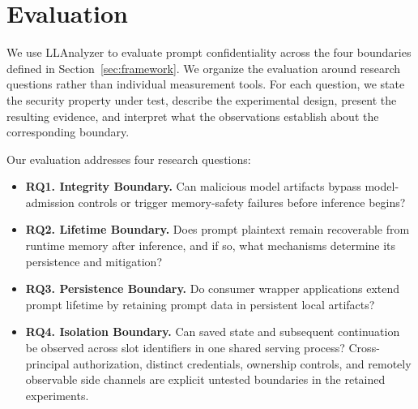\documentclass[journal,tifs]{IEEEtran}
\begin{document}

\section{Evaluation}
\label{sec:evaluation}

We use LLAnalyzer to evaluate prompt confidentiality across the four
boundaries defined in Section~\ref{sec:framework}. We organize the
evaluation around research questions rather than individual measurement
tools. For each question, we state the security property under test,
describe the experimental design, present the resulting evidence, and
interpret what the observations establish about the corresponding
boundary.

Our evaluation addresses four research questions:

\begin{itemize}[left=0pt]

\item \textbf{RQ1. Integrity Boundary.}
Can malicious model artifacts bypass model-admission controls or trigger
memory-safety failures before inference begins?

\item \textbf{RQ2. Lifetime Boundary.}
Does prompt plaintext remain recoverable from runtime memory after
inference, and if so, what mechanisms determine its persistence and
mitigation?

\item \textbf{RQ3. Persistence Boundary.}
Do consumer wrapper applications extend prompt lifetime by retaining
prompt data in persistent local artifacts?

\item \textbf{RQ4. Isolation Boundary.}
Can saved state and subsequent continuation be observed across slot
identifiers in one shared serving process? Cross-principal authorization,
distinct credentials, ownership controls, and remotely observable side
channels are explicit untested boundaries in the retained experiments.

\end{itemize}
\end{document}
